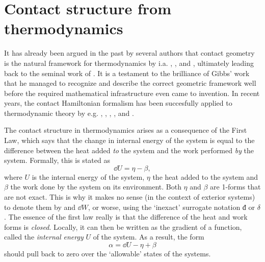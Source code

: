 \section{Contact structure from thermodynamics}
\label{sec:thermodynamics}
It has already been argued in the past by several authors that contact geometry is the natural framework for thermodynamics by i.a. \citet{Arnold1991,Arnold1989a,Arnold1989,Arnold1989b}, \citet{Bamberg1988}, \citet{Burke1985} and \citet{Hermann1973}, ultimately leading back to the seminal work of \citet{Gibbs1873}. It is a testament to the brilliance of Gibbs' work that he managed to recognize and describe the correct geometric framework well before the required mathematical infrastructure even came to invention. \cite{Wightman1979} 
In recent years, the contact Hamiltonian formalism has been succesfully applied to thermodynamic theory by e.g. \citet{Mrugala1991}, \citet{Balian2001}, \citet{VanderSchaft2021a}, \citet{Bravetti2015}, and \citet{Simoes2020}. 

The contact structure in thermodynamics arises as a consequence of the First Law, which says that the change in internal energy of the system is equal to the difference between the heat added \emph{to} the system and the work performed \emph{by} the system. Formally, this is stated as
\begin{equation}
    \dd{U} = \eta - \beta,
    \label{eq:thermo_first_law}
\end{equation}
where $U$ is the internal energy of the system, $\eta$ the heat added to the system and $\beta$ the work done by the system on its environment. Both $\eta$ and $\beta$ are 1-forms that are not exact. This is why it makes no sense (in the context of exterior systems) to denote them by \dj and $\dd{W}$, or worse, using the `inexact' surrogate notation $\text{đ}$ or $\delta$. The essence of the first law really is that the difference of the heat and work forms is \emph{closed}. Locally, it can then be written as the gradient of a function, called the \emph{internal energy} $U$ of the system. As a result, the form 
$$ \alpha = \dd{U} - \eta + \beta $$
should pull back to zero over the `allowable' states of the systems.


